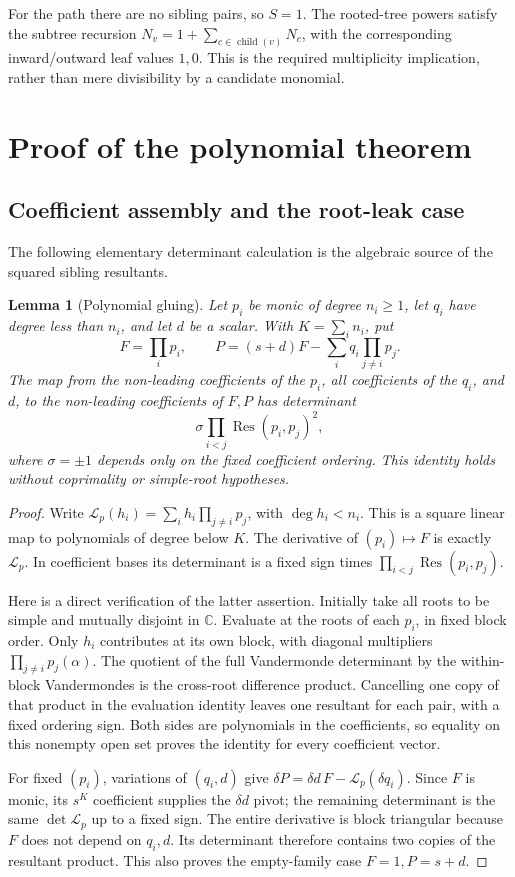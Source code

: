 \documentclass[11pt]{article}
\newtheorem{lemma}[theorem]{Lemma}
\theoremstyle{remark}
\newcommand{\C}{\mathbb C}
\newcommand{\Res}{\operatorname{Res}}
\newcommand{\1}{\mathbf 1}
\begin{document}
For the path there are no sibling pairs, so $S=1$. The rooted-tree powers
satisfy the subtree recursion $N_v=1+\sum_{c\in\operatorname{child}(v)}N_c$,
with the corresponding inward/outward leaf values $1,0$. This is the required
multiplicity implication, rather than mere divisibility by a candidate monomial.

\section{Proof of the polynomial theorem}
\subsection{Coefficient assembly and the root-leak case}
The following elementary determinant calculation is the algebraic source
of the squared sibling resultants.

\begin{lemma}[Polynomial gluing]\label{lem:glue}
Let $p_i$ be monic of degree $n_i\ge1$, let $q_i$ have degree less than $n_i$,
and let $d$ be a scalar. With $K=\sum_i n_i$, put
\[
 F=\prod_i p_i,\qquad
 P=(s+d)F-\sum_i q_i\prod_{j\ne i}p_j.
\]
The map from the non-leading coefficients of the $p_i$, all coefficients of
the $q_i$, and $d$, to the non-leading coefficients of $F,P$ has determinant
\[
 \sigma\prod_{i<j}\Res(p_i,p_j)^2,
\]
where $\sigma=\pm1$ depends only on the fixed coefficient ordering. This
identity holds without coprimality or simple-root hypotheses.
\end{lemma}
\begin{proof}
Write $\mathcal L_p(h_i)=\sum_i h_i\prod_{j\ne i}p_j$, with
$\deg h_i<n_i$. This is a square linear map to polynomials of degree below $K$.
The derivative of $(p_i)\mapsto F$ is exactly $\mathcal L_p$.
In coefficient bases its determinant is a fixed sign times
$\prod_{i<j}\Res(p_i,p_j)$.

Here is a direct verification of the latter assertion. Initially take all
roots to be simple and mutually disjoint in $\C$. Evaluate at the roots of
each $p_i$, in fixed block order. Only $h_i$ contributes at its own block,
with diagonal multipliers $\prod_{j\ne i}p_j(\alpha)$.
The quotient of the full Vandermonde determinant by the within-block
Vandermondes is the cross-root difference product. Cancelling one copy
of that product in the evaluation identity leaves one resultant for each
pair, with a fixed ordering sign. Both sides are polynomials in the
coefficients, so equality on this nonempty open set proves the identity
for every coefficient vector.

For fixed $(p_i)$, variations of $(q_i,d)$ give
$\delta P=\delta d\,F-\mathcal L_p(\delta q_i)$. Since $F$ is monic,
its $s^K$ coefficient supplies the $\delta d$ pivot; the remaining determinant
is the same $\det\mathcal L_p$ up to a fixed sign. The entire derivative is
block triangular because $F$ does not depend on $q_i,d$. Its determinant
therefore contains two copies of the resultant product. This also proves
the empty-family case $F=1,P=s+d$.
\end{proof}
\end{document}

